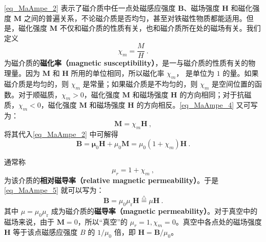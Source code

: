 \autoref{eq_MaAmpe_2} 表示了磁介质中任一点处磁感应强度 $\mathbf B$、磁场强度 $\mathbf H$ 和磁化强度 $\mathbf M $ 之间的普遍关系，不论磁介质是否均匀，甚至对铁磁性物质都能适用。但是，磁化强度 $\mathbf M $ 不仅和磁介质的性质有关，也和磁介质所在处的磁场有关。我们定义
\begin{equation} \label{eq_MaAmpe_4}
\chi_{m}=\frac{M}{H}~.
\end{equation}
为磁介质的\textbf{磁化率（magnetic susceptibility）}，是一与磁介质的性质有关的物理量。因为 $\mathbf M $ 和 $\mathbf H $ 所用的单位相同，所以磁化率 $\chi_m$， 是单位为 $1 $ 的量。如果磁介质是均匀的，则 $\chi_m$ 是常量；如果磁介质是不均匀的，则 $\chi_m$ 是空间位置的函数。对于顺磁质，$\chi_m>0$，磁化强度 $\mathbf M $ 和磁场强度 $\mathbf H $ 的方向相同；对于抗磁质，$\chi_m<0$，磁化强度 $\mathbf M $ 和磁场强度 $\mathbf H $ 的方向相反。\autoref{eq_MaAmpe_4} 又可写为：
\begin{equation} \label{eq_MaAmpe_5}
\mathbf M = \chi_m\mathbf H~,
\end{equation}
将其代入\autoref{eq_MaAmpe_2} 中可解得
\begin{equation}
\mathbf{B}=\mathbf{\mu}_{0} \mathbf{H}+\mu_{0} \mathbf{M}=\mu_{0}\left(1+\chi_{{m}}\right) \mathbf{H}~.
\end{equation}

通常称
\begin{equation}
\mu_{{r}}=1+\chi_{m}~,
\end{equation}
为该介质的\textbf{相对磁导率（relative magnetic permeability）}。于是\autoref{eq_MaAmpe_5} 就可以写为：
\begin{equation}
\mathbf B=\mu_{0} \mu_{\mathrm{r}} \mathbf H\overset{\triangle}=\mu \mathbf H~.
\end{equation}
其中 $\mu = \mu_{0} \mu_{\mathrm{r}} $ 成为磁介质的\textbf{磁导率（magnetic permeability）}。对于真空中的磁场来说，由于 $\mathbf M=0$，所以“真空”的 $\mu_r=1,\chi_m=0$。真空中各点处的磁场强度 $\mathbf H $ 等于该点磁感应强度 $B $ 的 $1/\mu_0$ 倍，即 $\mathbf H = \mathbf B / \mu_0$。
